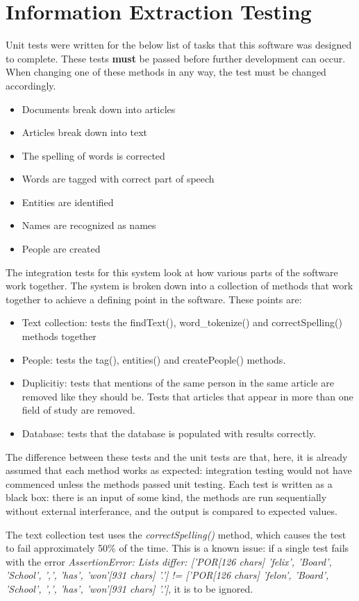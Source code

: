 \documentclass[11pt,a4paper]{article}
\begin{document}
\section{Information Extraction Testing}
Unit tests were written for the below list of tasks that this software was designed to complete. These tests \textbf{must} be passed before further development can occur. When changing one of these methods in any way, the test must be changed accordingly.
\begin{itemize}
	\item Documents break down into articles
	\item Articles break down into text
	\item The spelling of words is corrected
	\item Words are tagged with correct part of speech
	\item Entities are identified
	\item Names are recognized as names
	\item People are created
\end{itemize}
The integration tests for this system look at how various parts of the software work together. The system is broken down into a collection of methods that work together to achieve a defining point in the software. These points are:
\begin{itemize}
	\item Text collection: tests the findText(), word\_tokenize() and correctSpelling() methods together
	\item People: tests the tag(), entities() and createPeople() methods. 
	\item Duplicitiy: tests that mentions of the same person in the same article are removed like they should be. Tests that articles that appear in more than one field of study are removed.
	\item Database: tests that the database is populated with results correctly.
\end{itemize}
The difference between these tests and the unit tests are that, here, it is already assumed that each method works as expected: integration testing would not have commenced unless the methods passed unit testing. Each test is written as a black box: there is an input of some kind, the methods are run sequentially without external interferance, and the output is compared to expected values. 

The text collection test uses the \textit{correctSpelling()} method, which causes the test to fail approximately 50\% of the time. This is a known issue: if a single test fails with the error \textit{AssertionError: Lists differ: ['POR[126 chars] 'felix', 'Board', 'School', ',', 'has', 'won'[931 chars] '.'] != ['POR[126 chars] 'felon', 'Board', 'School', ',', 'has', 'won'[931 chars] '.']}, it is to be ignored. 
\end{document}
